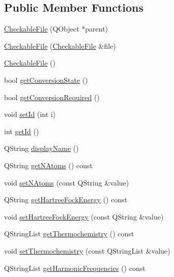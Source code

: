 \subsection*{Public Member Functions}
\begin{DoxyCompactItemize}
\item 
\hyperlink{class_checkable_file_a3d8d14bb50d4d49fb1ab1524bf55d9ad}{Checkable\+File} (Q\+Object $\ast$parent)
\item 
\hyperlink{class_checkable_file_a068da52675987aa9f097deccd04ebd11}{Checkable\+File} (\hyperlink{class_checkable_file}{Checkable\+File} \&file)
\item 
\hyperlink{class_checkable_file_a2c59938768966e97b014fffb360a4a02}{Checkable\+File} ()
\item 
bool \hyperlink{class_checkable_file_a114d896750eb28932939fdf85c50eaf7}{get\+Conversion\+State} ()
\item 
bool \hyperlink{class_checkable_file_a7e96997ce040ddfa1f96208cfbd726a7}{get\+Conversion\+Required} ()
\item 
void \hyperlink{class_checkable_file_ab5f603e8fb4b7bca7b23e731605229c6}{set\+Id} (int i)
\item 
int \hyperlink{class_checkable_file_aff4949da0fe81acb339b6160ed0fb694}{get\+Id} ()
\item 
Q\+String \hyperlink{class_checkable_file_a0ef90a49e1d9aac4988fd698b110207e}{display\+Name} ()
\item 
Q\+String \hyperlink{class_checkable_file_ab47013f328c9a8c1d2c69fd0154bf09d}{get\+N\+Atoms} () const 
\item 
void \hyperlink{class_checkable_file_a5b9a73cf9e7c46ff6ad04c471789846d}{set\+N\+Atoms} (const Q\+String \&value)
\item 
Q\+String \hyperlink{class_checkable_file_a6cdf454d74017f9952f2b6a3cf59aa6d}{get\+Hartree\+Fock\+Energy} () const 
\item 
void \hyperlink{class_checkable_file_ad6488c057deefef8773674bb597c87bd}{set\+Hartree\+Fock\+Energy} (const Q\+String \&value)
\item 
Q\+String\+List \hyperlink{class_checkable_file_a19379105e20add41c24030560c5796a5}{get\+Thermochemistry} () const 
\item 
void \hyperlink{class_checkable_file_a454fe6f9bea36029e128983ab13b4a84}{set\+Thermochemistry} (const Q\+String\+List \&value)
\item 
Q\+String\+List \hyperlink{class_checkable_file_a128db7443c7d5e5e9269ecc6086b39aa}{get\+Harmonic\+Frequencies} () const 
\item 

\end{DoxyCompactItemize}
